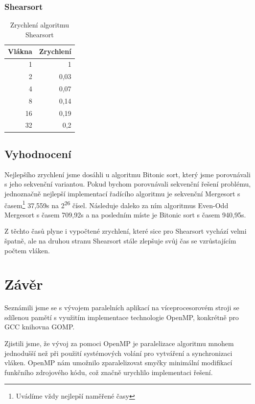 \documentclass[12pt]{article}
\begin{document}
\subsubsection{Shearsort}
\begin{table}[H]
\begin{center}
\begin{tabular}{|r|r|}
\hline Vlákna & Zrychlení\footnotemark[1] \\ \hline
1  & 1  \\ \hline
2  & 0,03  \\ \hline
4  & 0,07  \\ \hline
8  & 0,14  \\ \hline
16 & 0,19  \\ \hline
32 & 0,2  \\ \hline
\end{tabular} 
\end{center}
\caption{Zrychlení algoritmu Shearsort}
\end{table}

\subsection{Vyhodnocení}
Nejlepšího zrychlení jsme dosáhli u algoritmu Bitonic sort, který jsme porovnávali s jeho sekvenční variantou.
Pokud bychom porovnávali sekvenční řešení problému, jednoznačně nejlepší implementací řadícího algoritmu je
sekvenční Mergesort s časem\footnote[2]{Uvádíme vždy nejlepší naměřené časy} 37,559s 
na 2\textsuperscript{26} čísel. Následuje daleko za ním algoritmus Even-Odd Mergesort
s časem 709,92s a na posledním míste je Bitonic sort s časem 940,95s.

Z těchto časů plyne i vypočtené zrychlení, které sice pro Shearsort vychází velmi špatně, ale na druhou stranu
Shearsort stále zlepšuje svůj čas se vzrůstajícím počtem vláken.

\section{Závěr}
Seznámili jsme se s vývojem paralelních aplikací na víceprocesorovém stroji se sdílenou pamětí
s využitím implementace technologie OpenMP, konkrétně pro GCC knihovna GOMP.

Zjistili jsme, že vývoj za pomoci OpenMP je paralelizace algoritmu mnohem jednodušší než při použití
systémových volání pro vytváření a synchronizaci vláken. OpenMP nám umožnilo zparalelizovat
smyčky minimální modifikací funkčního zdrojového kódu, což značně urychlilo implementaci
řešení.
\end{document}

